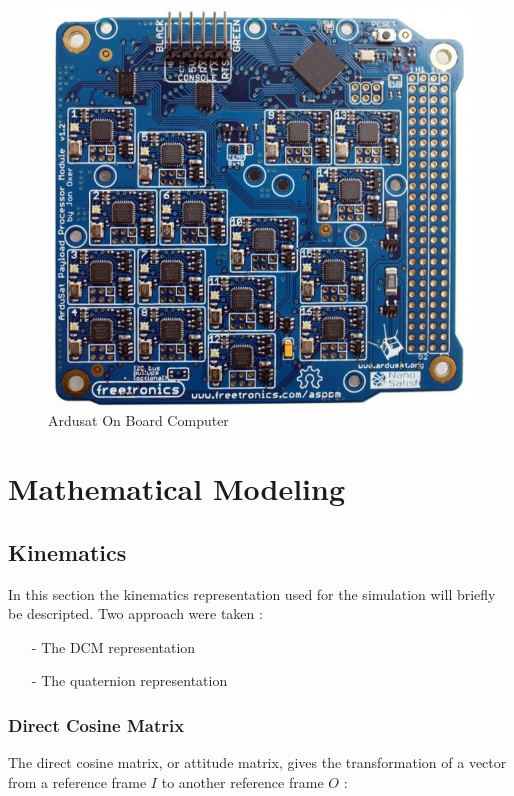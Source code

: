 \documentclass[11pt,a4paper]{report}
\begin{document}
\begin{figure}[H]
 	\centering
 	\includegraphics[scale=0.25]{gfx/ardusat.jpg}
    \caption{Ardusat On Board Computer}
\end{figure}

\chapter{Mathematical Modeling}

\section{Kinematics}
In this section the kinematics representation used for the simulation will briefly be descripted. Two approach were taken : 
\begin{itemize}
 \item [-] The DCM representation
 \item [-] The quaternion representation
\end{itemize}

\subsection{Direct Cosine Matrix}
The direct cosine matrix, or attitude matrix, gives the transformation of a vector from a reference frame $I$ to another reference frame $O$ : 
\end{document}
